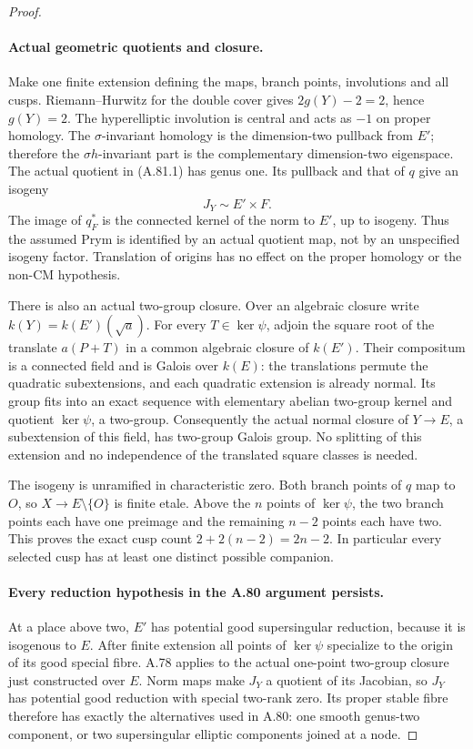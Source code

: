 \begin{proof}
\paragraph{Actual geometric quotients and closure.}
Make one finite extension defining the maps, branch points,
involutions and all cusps. Riemann--Hurwitz for the double
cover gives \(2g(Y)-2=2\), hence \(g(Y)=2\).
The hyperelliptic involution is central and acts as \(-1\)
on proper homology. The \(\sigma\)-invariant homology is
the dimension-two pullback from \(E'\); therefore the
\(\sigma h\)-invariant part is the complementary
dimension-two eigenspace. The actual quotient in (A.81.1)
has genus one. Its pullback and that of \(q\) give an
isogeny
\[
                       J_Y\sim E'\times F.             \tag{A.81.5}
\]
The image of \(q_F^*\) is the connected kernel of the
norm to \(E'\), up to isogeny. Thus the assumed Prym is
identified by an actual quotient map, not by an unspecified
isogeny factor. Translation of origins has no effect on
the proper homology or the non-CM hypothesis.

There is also an actual two-group closure. Over an algebraic
closure write \(k(Y)=k(E')(\sqrt a)\). For every
\(T\in\ker\psi\), adjoin the square root of the
translate \(a(P+T)\) in a common algebraic closure of
\(k(E')\). Their compositum is a connected field and
is Galois over \(k(E)\): the translations permute the
quadratic subextensions, and each quadratic extension is
already normal. Its group fits into an exact sequence
with elementary abelian two-group kernel and quotient
\(\ker\psi\), a two-group. Consequently the actual
normal closure of \(Y\to E\), a subextension of this
field, has two-group Galois group. No splitting of this
extension and no independence of the translated square
classes is needed.

The isogeny is unramified in characteristic zero. Both
branch points of \(q\) map to \(O\), so \(X\to E\setminus
\{O\}\) is finite etale. Above the \(n\) points of
\(\ker\psi\), the two branch points each have one
preimage and the remaining \(n-2\) points each have two.
This proves the exact cusp count \(2+2(n-2)=2n-2\).
In particular every selected cusp has at least one distinct
possible companion.

\paragraph{Every reduction hypothesis in the A.80 argument persists.}
At a place above two, \(E'\) has potential good
supersingular reduction, because it is isogenous to \(E\).
After finite extension all points of \(\ker\psi\)
specialize to the origin of its good special fibre.
A.78 applies to the actual one-point two-group closure
just constructed over \(E\). Norm maps make \(J_Y\)
a quotient of its Jacobian, so \(J_Y\) has potential
good reduction with special two-rank zero. Its proper
stable fibre therefore has exactly the alternatives used
in A.80: one smooth genus-two component, or two
supersingular elliptic components joined at a node.


\end{proof}
